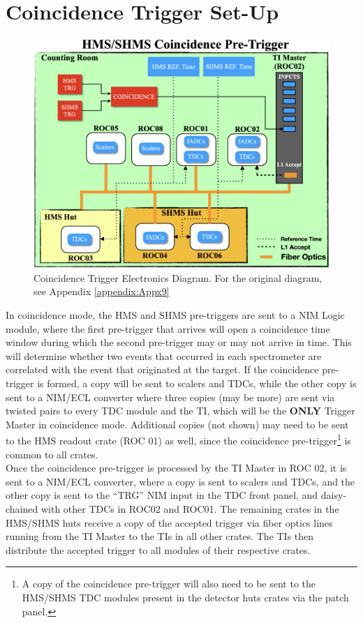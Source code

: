 \documentclass[11pt]{article}
\begin{document}
\section{Coincidence Trigger Set-Up}
\begin{figure}[h!]
  \centering
  \includegraphics[scale=0.35]{Coin_diagram.png}
  \caption{Coincidence Trigger Electronics Diagram. For the original diagram, see Appendix \ref{appendix:Appx9}}
  \label{fig:Coin_TRG}
\end{figure}
\indent In coincidence mode, the HMS and SHMS pre-triggers are sent to a NIM Logic module, where the first pre-trigger that arrives will open
a coincidence time window during which the second pre-trigger may or may not arrive in time. This will determine whether two events that occurred in
each spectrometer are correlated with the event that originated at the target. If the coincidence pre-trigger is formed, a copy will be sent to
scalers and TDCs, while the other copy is sent to a NIM/ECL converter where three copies (may be more) are sent via twisted pairs to every TDC module and the TI, which will be the \textbf{ONLY} Trigger Master in coincidence mode. Additional copies (not shown) may need to be sent to the HMS readout crate (ROC 01) as well, since the coincidence pre-trigger\footnote{A copy of the coincidence pre-trigger will also need to be sent to the
  HMS/SHMS TDC modules present in the detector huts crates via the patch panel.} is common to all crates. \\
\indent Once the coincidence pre-trigger is processed by the TI Master in ROC 02, it is sent to a NIM/ECL converter, where a copy is sent to scalers and TDCs, and the other copy is sent to the ``TRG'' NIM input in the TDC front panel, and daisy-chained with other TDCs in ROC02 and ROC01. The remaining crates in the HMS/SHMS huts receive a copy of the accepted trigger via fiber optics lines running from the TI Master to the TIs in all other crates. The TIs then distribute the accepted trigger to all modules of their respective crates.
\end{document}

